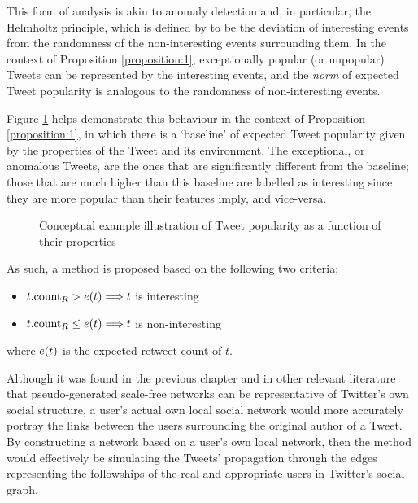This form of analysis is akin to anomaly detection and, in particular, the Helmholtz principle, which is defined by \citet{balinsky11} to be the deviation of interesting events from the randomness of the non-interesting events surrounding them. In the context of Proposition \ref{proposition:1}, exceptionally popular (or unpopular) Tweets can be represented by the interesting events, and the \textit{norm} of expected Tweet popularity is analogous to the randomness of non-interesting events.

Figure \ref{fig:helmholtz} helps demonstrate this behaviour in the context of Proposition \ref{proposition:1}, in which there is a `baseline' of expected Tweet popularity given by the properties of the Tweet and its environment. The exceptional, or anomalous Tweets, are the ones that are significantly different from the baseline; those that are much higher than this baseline are labelled as interesting since they are more popular than their features imply, and vice-versa.

\begin{figure}[h]
\centering
{}
\caption{Conceptual example illustration of Tweet popularity as a function of their properties}
\label{fig:helmholtz}
\end{figure}

As such, a method is proposed based on the following two criteria;
\begin{itemize}
    \item $t.\textrm{count}_R > e(t) \Longrightarrow t$ is interesting
    \item $t.\textrm{count}_R \leq e(t) \Longrightarrow t$ is non-interesting
\end{itemize}
where $e(t)$ is the expected retweet count of $t$.

Although it was found in the previous chapter and in other relevant literature that pseudo-generated scale-free networks can be representative of Twitter's own social structure, a user's actual own local social network would more accurately portray the links between the users surrounding the original author of a Tweet. By constructing a network based on a user's own local network, then the method would effectively be simulating the Tweets' propagation through the edges representing the followships of the real and appropriate users in Twitter's social graph.


